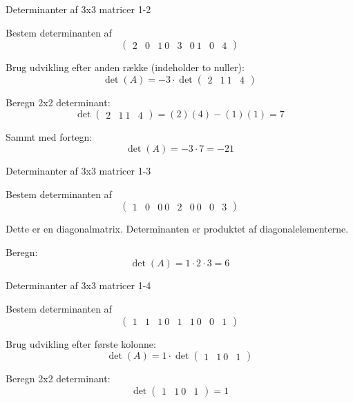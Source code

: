 \documentclass{article}
\begin{document}
\begin{exercise}{Determinanter af 3x3 matricer 1-2}

Bestem determinanten af
\[
\begin{pmatrix}
2 & 0 & 1 \
0 & 3 & 0 \
1 & 0 & 4
\end{pmatrix}
\]


\hint

Brug udvikling efter anden række (indeholder to nuller):
\[
\det(A) = -3 \cdot \det \begin{pmatrix} 2 & 1 \ 1 & 4 \end{pmatrix}
\]

\hint

Beregn 2x2 determinant:
\[
\det \begin{pmatrix} 2 & 1 \ 1 & 4 \end{pmatrix} = (2)(4) - (1)(1) = 7
\]

\hint

Sammt med fortegn:
\[
\det(A) = -3 \cdot 7 = -21
\]

\end{exercise}

\newpage

\begin{exercise}{Determinanter af 3x3 matricer 1-3}

Bestem determinanten af
\[
\begin{pmatrix}
1 & 0 & 0 \
0 & 2 & 0 \
0 & 0 & 3
\end{pmatrix}
\]


\hint

Dette er en diagonalmatrix. Determinanten er produktet af diagonalelementerne.

\hint

Beregn:
\[
\det(A) = 1 \cdot 2 \cdot 3 = 6
\]

\end{exercise}

\newpage

\begin{exercise}{Determinanter af 3x3 matricer 1-4}

Bestem determinanten af
\[
\begin{pmatrix}
1 & 1 & 1 \
0 & 1 & 1 \
0 & 0 & 1
\end{pmatrix}
\]

\answerbox{1}

\hint

Brug udvikling efter første kolonne:
\[
\det(A) = 1 \cdot \det \begin{pmatrix} 1 & 1 \ 0 & 1 \end{pmatrix}
\]

\hint

Beregn 2x2 determinant:
\[
\det \begin{pmatrix} 1 & 1 \ 0 & 1 \end{pmatrix} = 1
\]

\end{exercise}
\end{document}
